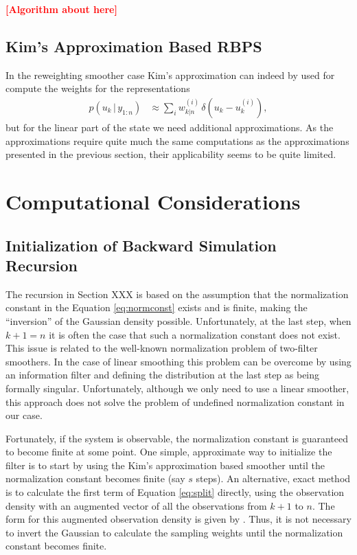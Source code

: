 \documentclass[twocolumn]{autart}    %
\newcommand{\comment}[1]{\textcolor{red}{\textbf{[#1]}}}
\begin{document}
\comment{Algorithm about here}

\subsection{Kim's Approximation Based RBPS}
%


In the reweighting smoother case Kim's approximation can indeed by
used for compute the weights for the representations
%
\begin{equation}
\begin{split}
  p(u_{k}\,|\,y_{1:n})
  &\approx \sum_{i} w^{(i)}_{k|n} \, \delta(u_{k} - u_{k}^{(i)}),
\end{split}
\end{equation}
%
but for the linear part of the state we need additional
approximations. As the approximations require quite much the same
computations as the approximations presented in the previous section,
their applicability seems to be quite limited.


\section{Computational Considerations}

\subsection{Initialization of Backward Simulation Recursion}
%
The recursion in Section XXX is based on the assumption that
the normalization constant in the Equation \eqref{eq:normconst} exists
and is finite, making the ``inversion'' of the Gaussian density
possible.  Unfortunately, at the last step, when $k+1 = n$ it is often
the case that such a normalization constant does not exist. This
issue is related to the well-known normalization problem of
two-filter smoothers. In the case of linear smoothing this
problem can be overcome by using an information filter and defining
the distribution at the last step as being formally singular.
Unfortunately, although we only need to use a linear smoother, this
approach does not solve the problem of undefined normalization
constant in our case.

Fortunately, if the system is observable, the normalization constant
is guaranteed to become finite at some point. One simple, approximate
way to initialize the filter is to start by using the Kim's approximation
based smoother until the normalization constant becomes finite (say
$s$ steps). An alternative, exact method is to calculate
the first term of Equation \eqref{eq:split} directly, using the
observation density with an augmented vector of all the observations
from $k+1$ to $n$. The form for this augmented observation density is
given by \cite{Kitagawa:1994}. Thus, it is not necessary to invert
the Gaussian to calculate the sampling weights until the normalization
constant becomes finite.
\end{document}
